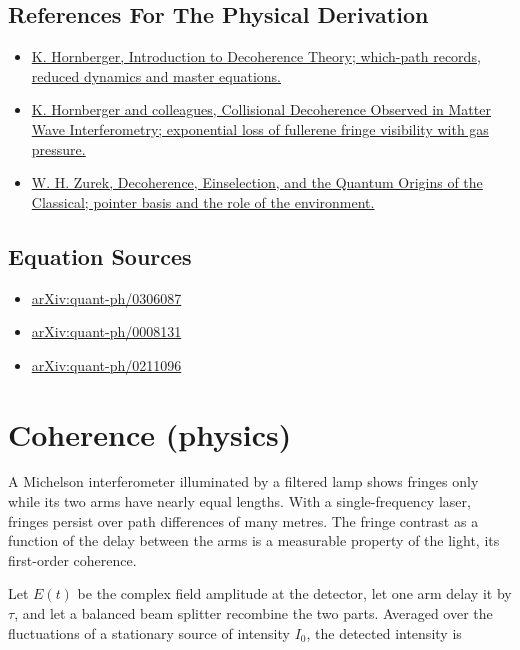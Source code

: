\documentclass[11pt,oneside]{book}
\begin{document}
\subsection*{References For The Physical Derivation}
\begin{itemize}
\item \href{https://arxiv.org/abs/quant-ph/0612118}{K. Hornberger, Introduction to Decoherence Theory; which-path records, reduced dynamics and master equations.}
\item \href{https://arxiv.org/abs/quant-ph/0303093}{K. Hornberger and colleagues, Collisional Decoherence Observed in Matter Wave Interferometry; exponential loss of fullerene fringe visibility with gas pressure.}
\item \href{https://arxiv.org/abs/quant-ph/0105127}{W. H. Zurek, Decoherence, Einselection, and the Quantum Origins of the Classical; pointer basis and the role of the environment.}
\end{itemize}



\subsection*{Equation Sources}
\begin{itemize}
\item \href{https://arxiv.org/abs/quant-ph/0306087}{arXiv:quant-ph/0306087}
\item \href{https://arxiv.org/abs/quant-ph/0008131}{arXiv:quant-ph/0008131}
\item \href{https://arxiv.org/abs/quant-ph/0211096}{arXiv:quant-ph/0211096}
\end{itemize}

\clearpage

\section{Coherence (physics)}

\label{topic:coherence-physics}

A Michelson interferometer illuminated by a filtered lamp shows fringes only while its two arms have nearly equal lengths. With a single-frequency laser, fringes persist over path differences of many metres. The fringe contrast as a function of the delay between the arms is a measurable property of the light, its first-order coherence.

Let \(E(t)\) be the complex field amplitude at the detector, let one arm delay it by \(\tau\), and let a balanced beam splitter recombine the two parts. Averaged over the fluctuations of a stationary source of intensity \(I_0\), the detected intensity is
\end{document}
